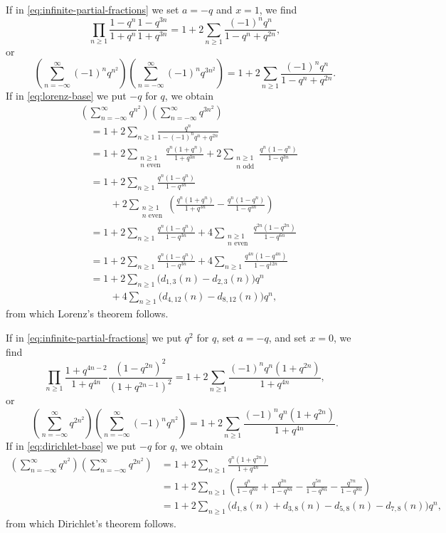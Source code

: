\documentclass[10pt]{article}
\begin{document}
If in \eqref{eq:infinite-partial-fractions} we set $a=-q$ and $x=1$, we find
\[
\prod_{n\geq 1}
 \frac{1-q^n}{1+q^n}\frac{1-q^{3n}}{1+q^{3n}}
 =1+2\sum_{n\geq 1}\frac{(-1)^nq^n}{1-q^n+q^{2n}},
\]
or
\begin{equation}
\left(\sum_{n=-\infty}^{\infty}(-1)^nq^{n^2}\right)
\left(\sum_{n=-\infty}^{\infty}(-1)^nq^{3n^2}\right)
 =1+2\sum_{n\geq 1}\frac{(-1)^nq^n}{1-q^n+q^{2n}}.
\label{eq:lorenz-base}
\end{equation}
If in \eqref{eq:lorenz-base} we put $-q$ for $q$, we obtain
\[
\begin{aligned}
&\left(\sum_{n=-\infty}^{\infty}q^{n^2}\right)
 \left(\sum_{n=-\infty}^{\infty}q^{3n^2}\right) \\
&\quad=1+2\sum_{n\geq 1}
 \frac{q^n}{1-(-1)^nq^n+q^{2n}} \\
&\quad=1+2\sum_{\substack{n\geq 1\\n\text{ even}}}
 \frac{q^n(1+q^n)}{1+q^{3n}}
 +2\sum_{\substack{n\geq 1\\n\text{ odd}}}
 \frac{q^n(1-q^n)}{1-q^{3n}} \\
&\quad=1+2\sum_{n\geq 1}\frac{q^n(1-q^n)}{1-q^{3n}} \\
&\qquad\quad
 +2\sum_{\substack{n\geq 1\\n\text{ even}}}
 \left(\frac{q^n(1+q^n)}{1+q^{3n}}
       -\frac{q^n(1-q^n)}{1-q^{3n}}\right) \\
&\quad=1+2\sum_{n\geq 1}\frac{q^n(1-q^n)}{1-q^{3n}}
 +4\sum_{\substack{n\geq 1\\n\text{ even}}}
 \frac{q^{2n}(1-q^{2n})}{1-q^{6n}} \\
&\quad=1+2\sum_{n\geq 1}\frac{q^n(1-q^n)}{1-q^{3n}}
 +4\sum_{n\geq 1}\frac{q^{4n}(1-q^{4n})}{1-q^{12n}} \\
&\quad=1+2\sum_{n\geq 1}\bigl(d_{1,3}(n)-d_{2,3}(n)\bigr)q^n \\
&\qquad\quad
 +4\sum_{n\geq 1}\bigl(d_{4,12}(n)-d_{8,12}(n)\bigr)q^n,
\end{aligned}
\]
from which Lorenz's theorem follows.

If in \eqref{eq:infinite-partial-fractions} we put $q^2$ for $q$, set $a=-q$,
and set $x=0$, we find
\[
\prod_{n\geq 1}
 \frac{1+q^{4n-2}}{1+q^{4n}}
 \frac{(1-q^{2n})^2}{(1+q^{2n-1})^2}
 =1+2\sum_{n\geq 1}
 \frac{(-1)^nq^n(1+q^{2n})}{1+q^{4n}},
\]
or
\begin{equation}
\left(\sum_{n=-\infty}^{\infty}q^{2n^2}\right)
\left(\sum_{n=-\infty}^{\infty}(-1)^nq^{n^2}\right)
 =1+2\sum_{n\geq 1}
 \frac{(-1)^nq^n(1+q^{2n})}{1+q^{4n}}.
\label{eq:dirichlet-base}
\end{equation}
If in \eqref{eq:dirichlet-base} we put $-q$ for $q$, we obtain
\[
\begin{aligned}
\left(\sum_{n=-\infty}^{\infty}q^{n^2}\right)
\left(\sum_{n=-\infty}^{\infty}q^{2n^2}\right)
 &=1+2\sum_{n\geq 1}\frac{q^n(1+q^{2n})}{1+q^{4n}} \\
 &=1+2\sum_{n\geq 1}
 \left(\frac{q^n}{1-q^{8n}}
      +\frac{q^{3n}}{1-q^{8n}}
      -\frac{q^{5n}}{1-q^{8n}}
      -\frac{q^{7n}}{1-q^{8n}}\right) \\
 &=1+2\sum_{n\geq 1}
 \bigl(d_{1,8}(n)+d_{3,8}(n)-d_{5,8}(n)-d_{7,8}(n)\bigr)q^n,
\end{aligned}
\]
from which Dirichlet's theorem follows.
\end{document}

